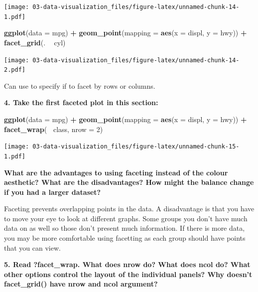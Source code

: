 \documentclass[]{book}
\newenvironment{Shaded}{\begin{snugshade}}{\end{snugshade}}
\newcommand{\DataTypeTok}[1]{\textcolor[rgb]{0.13,0.29,0.53}{#1}}
\newcommand{\DecValTok}[1]{\textcolor[rgb]{0.00,0.00,0.81}{#1}}
\newcommand{\KeywordTok}[1]{\textcolor[rgb]{0.13,0.29,0.53}{\textbf{#1}}}
\newcommand{\NormalTok}[1]{#1}
\newcommand{\OperatorTok}[1]{\textcolor[rgb]{0.81,0.36,0.00}{\textbf{#1}}}
\newcommand{\StringTok}[1]{\textcolor[rgb]{0.31,0.60,0.02}{#1}}
\theoremstyle{definition}
\theoremstyle{definition}
\theoremstyle{definition}
\theoremstyle{remark}
\begin{document}
\texttt{[image: 03-data-visualization\_files/figure-latex/unnamed-chunk-14-1.pdf]}

\begin{Shaded}
\begin{Highlighting}[]
\KeywordTok{ggplot}\NormalTok{(}\DataTypeTok{data =}\NormalTok{ mpg) }\OperatorTok{+}\StringTok{ }
\StringTok{  }\KeywordTok{geom_point}\NormalTok{(}\DataTypeTok{mapping =} \KeywordTok{aes}\NormalTok{(}\DataTypeTok{x =}\NormalTok{ displ, }\DataTypeTok{y =}\NormalTok{ hwy)) }\OperatorTok{+}
\StringTok{  }\KeywordTok{facet_grid}\NormalTok{(. }\OperatorTok{~}\StringTok{ }\NormalTok{cyl)}
\end{Highlighting}
\end{Shaded}

\texttt{[image: 03-data-visualization\_files/figure-latex/unnamed-chunk-14-2.pdf]}

Can use to specify if to facet by rows or columns.

\textbf{4. Take the first faceted plot in this section:}

\begin{Shaded}
\begin{Highlighting}[]
\KeywordTok{ggplot}\NormalTok{(}\DataTypeTok{data =}\NormalTok{ mpg) }\OperatorTok{+}\StringTok{ }
\StringTok{  }\KeywordTok{geom_point}\NormalTok{(}\DataTypeTok{mapping =} \KeywordTok{aes}\NormalTok{(}\DataTypeTok{x =}\NormalTok{ displ, }\DataTypeTok{y =}\NormalTok{ hwy)) }\OperatorTok{+}\StringTok{ }
\StringTok{  }\KeywordTok{facet_wrap}\NormalTok{(}\OperatorTok{~}\StringTok{ }\NormalTok{class, }\DataTypeTok{nrow =} \DecValTok{2}\NormalTok{)}
\end{Highlighting}
\end{Shaded}

\texttt{[image: 03-data-visualization\_files/figure-latex/unnamed-chunk-15-1.pdf]}

\textbf{What are the advantages to using faceting instead of the colour
aesthetic? What are the disadvantages? How might the balance change if
you had a larger dataset?}

Faceting prevents overlapping points in the data. A disadvantage is that
you have to move your eye to look at different graphs. Some groups you
don't have much data on as well so those don't present much information.
If there is more data, you may be more comfortable using facetting as
each group should have points that you can view.

\textbf{5. Read ?facet\_wrap. What does nrow do? What does ncol do? What
other options control the layout of the individual panels? Why doesn't
facet\_grid() have nrow and ncol argument?}
\end{document}
